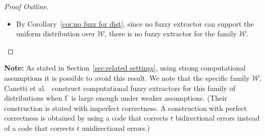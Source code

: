 \documentclass[11pt]{article}
\newcommand{\secref}[1]{\mbox{Section~\ref{#1}}}
\newcommand{\corref}[1]{\mbox{Corollary~\ref{#1}}}
\newcommand{\class}[1]{{\ensuremath{\mathsf{#1}}}}
\newcommand{\key}{\ensuremath{\class{key}}\xspace}
\newcommand{\gen}{\ensuremath{\class{Gen}}\xspace}
\newcommand{\rep}{\ensuremath{\class{Rep}}\xspace}
\newcommand{\sketch}{\ensuremath{\class{SS}}\xspace}
\begin{document}
\begin{proof}[Proof Outline]
\begin{itemize}
\begin{itemize}
\item Consider some $\key \in R_{small}$.  %
Consider the set of $V_{\key } = \{w | \rep(w, p) = \key \}$.  All points in $V | \sketch(V)$ are distance $t$ from a boundary of $V_\key$~(the functionality of $\rep$ guarantees that for the true $w$ all nearby points map to the same $\key$).  We show that most of $V_\key$ is near a boundary.  A result of Frankel and F{\"u}redi says that the boundary of a region is minimized by a ball containing the same number of points~\cite{frankl1981short} .  Hoeffding's inequality says that most of a ball lies near its boundary~\cite{hoeffding1963probability}.  Together these two results imply that $V_\key$ is small.
\item As before, there are many possible values for $z_1, z_2$ for the side information $Z$~(and these possible values are equally likely).  Furthermore, the distributions $V|Z=z_1 $ and $V| Z=z_1$ have disjoint support outside of $v$.
\item For most values of possible $Z$, the intersection between the viable pre images of $V|Z$ and $V_\key$ contains at most one point~(the received point $v$).  Thus, for most values of $Z$, keys lying in $R_{small}$ can be labeled as ``random''.
\end{itemize}
\item By \corref{cor:no fuzz for dist}, since no fuzzy extractor can support the uniform distribution over $\mathcal{W}$, there is no fuzzy extractor for the family $\mathcal{W}$.
\end{itemize}

\end{proof}

\noindent
\textbf{Note:} As stated in \secref{sec:related settings}, using strong computational assumptions it is possible to avoid this result.  We note that the specific family $\mathcal{W}$, Canetti et al.~\cite[Construction 5.3]{canetti2014key} construct computational fuzzy extractors  for this family of distributions when $\mathbb{F}$ is large enough under weaker assumptions.  (Their construction is stated with imperfect correctness.  A construction with perfect correctness is obtained by using a code that corrects $t$ bidirectional errors instead of a code that corrects $t$ unidirectional errors.)
\end{document}
